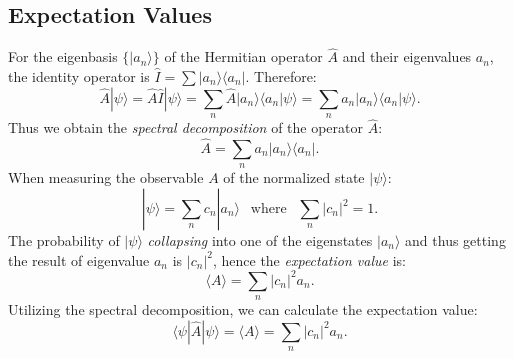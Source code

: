 	\subsection{Expectation Values}\label{expectation}
	For the eigenbasis $\{|a_n\rangle\}$ of the Hermitian operator $\hat{A}$ and their eigenvalues $a_n$, 
	the identity operator is $\hat{I} = \sum|a_n\rangle\langle a_n|$. Therefore:
	\[\hat{A}|\psi\rangle = \hat{A}\hat{I}|\psi\rangle = \sum_{n}\hat{A}|a_n\rangle\langle a_n|\psi\rangle = \sum_{n}a_n|a_n\rangle\langle a_n|\psi\rangle.\]
	Thus we obtain the \emph{spectral decomposition} of the operator $\hat{A}$:
	\[\hat{A} = \sum_{n}a_n|a_n\rangle\langle a_n|.\]
	When measuring the observable $A$ of the normalized state $|\psi\rangle$:
	\[|\psi\rangle = \sum_{n}c_n|a_n\rangle \ \ \text{   where   }\ \  \sum_{n}|c_n|^2 = 1.\]
	The probability of $|\psi\rangle$ \emph{collapsing} into one of the eigenstates $|a_n\rangle$ and thus getting the result of eigenvalue $a_n$ is $|c_n|^2$, 
	hence the \emph{expectation value} is:
	\[\langle A \rangle = \sum_{n}|c_n|^2a_n.\]
	Utilizing the spectral decomposition, we can calculate the expectation value:
	\[\langle\psi|\hat{A}|\psi\rangle = \langle A \rangle = \sum_{n}|c_n|^2a_n.\]
	
